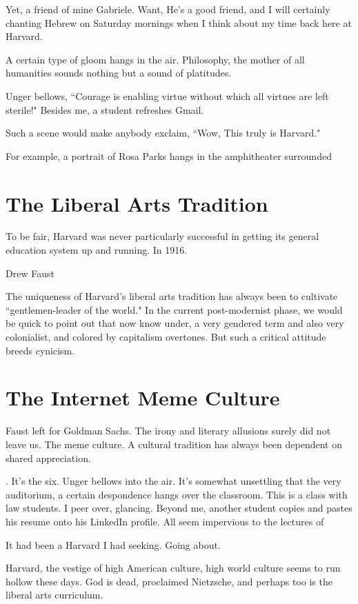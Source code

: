 \documentclass[12pt,letterpaper]{article}
\begin{document}
Yet, a friend of mine Gabriele.  Want, He's a good friend, and I will certainly chanting Hebrew on Saturday mornings when I think about my time back here at Harvard.

A certain type of gloom hangs in the air.  Philosophy, the mother of all humanities sounds nothing but a sound of platitudes.  

Unger bellows, ``Courage is enabling virtue without which all virtues are left sterile!"  Besides me, a student refreshes Gmail.


 Such a scene would make anybody exclaim, ``Wow,  This truly is Harvard."

For example, a portrait of Rosa Parks hangs in the amphitheater surrounded 

\section{The Liberal Arts Tradition}
To be fair, Harvard was never particularly successful in getting its general education system up and running.  In 1916.

Drew Faust

The uniqueness of Harvard's liberal arts tradition has always been to cultivate ``gentlemen-leader of the world."  In the current post-modernist phase, we would be quick to point out that now know under, a very gendered term and also very colonialist, and colored by capitalism overtones.  But such a critical attitude breeds cynicism.

\section{The Internet Meme Culture}

Faust left for Goldman Sachs.  The irony and literary allusions surely did not leave us.  The meme culture.  A cultural tradition has always been dependent on shared appreciation.

.   It's the six.  Unger bellows into the air.  It's somewhat unsettling that the very auditorium, a certain despondence hangs over the classroom.  This is a class with law students.  I peer over, glancing.  Beyond me, another student copies and pastes his resume onto his LinkedIn profile.  All seem impervious to the lectures of 

It had been a Harvard I had seeking.  Going about.

Harvard, the vestige of high American culture, high world culture seems to run hollow these days.  God is dead, proclaimed Nietzsche, and perhaps too is the liberal arts curriculum.
\end{document}
